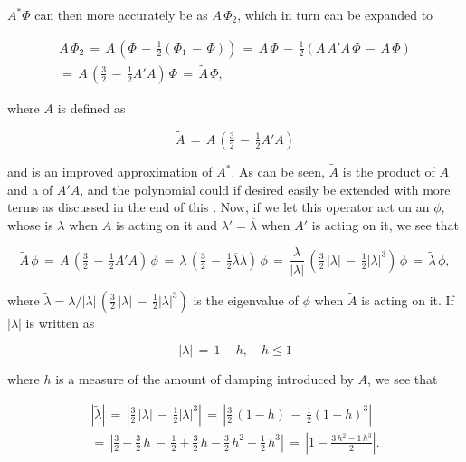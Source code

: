 $A^*\Phi$ can then more accurately be \approximated as $A\,\Phi_2$, which in turn can be expanded to

\begin{equation}
\begin{array}{c}
A\,\Phi_2 \,=\, A\,\left(\Phi \,-\, \tfrac{1}{2}(\Phi_1 \,-\, \Phi)\right) \,=\, A\,\Phi \,-\, \tfrac{1}{2}(A\,A'A\,\Phi \,-\, A\,\Phi) \\
=\, A\,\left(\tfrac{3}{2} \,-\, \tfrac{1}{2}A'A\right)\,\Phi \,=\, \tilde{A}\,\Phi,
\end{array}
\end{equation}

where $\tilde{A}$ is defined as

\begin{equation} \label{eq:compensated_advection_operator}
\tilde{A} \,=\, A\,\left(\tfrac{3}{2} \,-\, \tfrac{1}{2}A'A\right)
\end{equation}
 
and is an improved approximation of $A^*$. As can be seen, $\tilde{A}$ is the product of $A$ and a \polynomial of $A'A$, and the polynomial could if desired easily be extended with more terms as discussed in the end of this \levelname. Now, if we let this operator act on an \eigenfunction $\phi$, whose \eigenvalue is $\lambda$ when $A$ is acting on it and $\lambda' = \overline{\lambda}$ when $A'$ is acting on it, we see that 

\begin{equation}
\tilde{A}\,\phi \,=\, A\,\left(\tfrac{3}{2} \,-\, \tfrac{1}{2}A'A\right)\,\phi \,=\, \lambda\,\left(\tfrac{3}{2} \,-\, \tfrac{1}{2}\overline{\lambda}\lambda\right)\,\phi \,=\, \frac{\lambda}{|\lambda|}\,\left(\tfrac{3}{2}\,|\lambda| \,-\, \tfrac{1}{2}|\lambda|^3\right)\,\phi \,=\, \tilde{\lambda}\,\phi,
\end{equation}

where $\tilde{\lambda} = \lambda/|\lambda|\,\left(\tfrac{3}{2}\,|\lambda| \,-\, \tfrac{1}{2}|\lambda|^3\right)$ is the eigenvalue of $\phi$ when $\tilde{A}$ is acting on it. If $|\lambda|$ is written as

\begin{equation}
|\lambda| \,=\, 1 - h, \quad h \leq 1
\end{equation}

where $h$ is a measure of the amount of damping introduced by $A$, we see that

\begin{equation}
\begin{array}{c}
|\tilde{\lambda}| \,=\, \left|\tfrac{3}{2}\,|\lambda| \,-\, \tfrac{1}{2}|\lambda|^3\right| \,=\, \left|\tfrac{3}{2}\,(1-h) \,-\, \tfrac{1}{2}(1-h)^3\right| \\
=\, \left|\tfrac{3}{2}-\tfrac{3}{2}\,h \,-\, \tfrac{1}{2} + \tfrac{3}{2}\,h - \tfrac{3}{2}\,h^2 + \tfrac{1}{2}\,h^3\right| \,=\, \left|1 - \displaystyle\frac{3\,h^2 - 1\,h^3}{2}\right|.
\end{array}
\end{equation}

